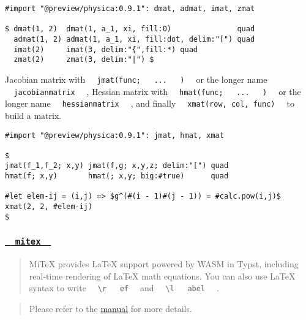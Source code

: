 \begin{verbatim}
#import "@preview/physica:0.9.1": dmat, admat, imat, zmat

$ dmat(1, 2)  dmat(1, a_1, xi, fill:0)               quad
  admat(1, 2) admat(1, a_1, xi, fill:dot, delim:"[") quad
  imat(2)     imat(3, delim:"{",fill:*) quad
  zmat(2)     zmat(3, delim:"|") $
\end{verbatim}

\pandocbounded{}

Jacobian matrix with
\texttt{\ }{\texttt{\ jmat(func;\ }}\texttt{\ }{\texttt{\ ...\ }}\texttt{\ }{\texttt{\ )\ }}\texttt{\ }
or the longer name \texttt{\ }{\texttt{\ jacobianmatrix\ }}\texttt{\ } ,
Hessian matrix with
\texttt{\ }{\texttt{\ hmat(func;\ }}\texttt{\ }{\texttt{\ ...\ }}\texttt{\ }{\texttt{\ )\ }}\texttt{\ }
or the longer name \texttt{\ }{\texttt{\ hessianmatrix\ }}\texttt{\ } ,
and finally \texttt{\ }{\texttt{\ xmat(row,\ col,\ func)\ }}\texttt{\ }
to build a matrix.

\begin{verbatim}
#import "@preview/physica:0.9.1": jmat, hmat, xmat

$
jmat(f_1,f_2; x,y) jmat(f,g; x,y,z; delim:"[") quad
hmat(f; x,y)       hmat(; x,y; big:#true)      quad

#let elem-ij = (i,j) => $g^(#(i - 1)#(j - 1)) = #calc.pow(i,j)$
xmat(2, 2, #elem-ij)
$
\end{verbatim}

\pandocbounded{}

\subsubsection{\texorpdfstring{\hyperref[mitex]{\texttt{\ }{\texttt{\ mitex\ }}\texttt{\ }}}{  mitex  }}\label{mitex}

\begin{quote}
MiTeX provides LaTeX support powered by WASM in Typst, including
real-time rendering of LaTeX math equations. You can also use LaTeX
syntax to write
\texttt{\ }{\texttt{\ \textbackslash{}r\ }}\texttt{\ }{\texttt{\ ef\ }}\texttt{\ }
and
\texttt{\ }{\texttt{\ \textbackslash{}l\ }}\texttt{\ }{\texttt{\ abel\ }}\texttt{\ }
.
\end{quote}

\begin{quote}
Please refer to the \href{https://github.com/mitex-rs/mitex}{manual} for
more details.
\end{quote}

